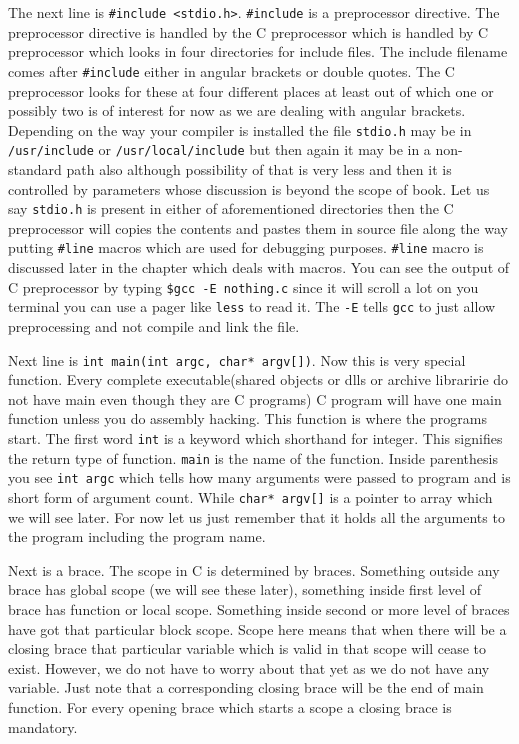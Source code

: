 The next line is \texttt{\#include <stdio.h>}. \texttt{\#include} is a
preprocessor directive. The preprocessor directive is handled by the C
preprocessor which is handled by C preprocessor which looks in four directories
for include files. The include filename comes after \texttt{\#include} either in
angular brackets or double quotes. The C preprocessor looks for these at four
different places at least out of which one or possibly two is of interest for
now as we are dealing with angular brackets. Depending on the way your compiler
is installed the file \texttt{stdio.h} may be in \texttt{/usr/include} or
\texttt{/usr/local/include} but then again it may be in a non-standard path
also although possibility of that is very less and then it is controlled by
parameters whose discussion is beyond the scope of book. Let us say
\texttt{stdio.h} is present in either of aforementioned directories then the C
preprocessor will copies the contents and pastes them in source file along the
way putting \texttt{\#line} macros which are used for debugging
purposes. \texttt{\#line} macro is discussed later in the chapter which deals
with macros. You can see the output of C preprocessor by typing \texttt{\$gcc
  -E nothing.c} since it will scroll a lot on you terminal you can use a pager
like \texttt{less} to read it. The \texttt{-E} tells \texttt{gcc} to just allow
preprocessing and not compile and link the file.

Next line is \texttt{int main(int argc, char* argv[])}. Now this is very special
function. Every complete executable(shared objects or dlls or archive
libraririe do not have main even though they are C programs) C program will
have one main function unless you do assembly hacking. This function is where
the programs start. The first word \texttt{int} is a keyword which shorthand
for integer. This signifies the return type of function. \texttt{main} is the
name of the function. Inside parenthesis you see \texttt{int argc} which tells
how many arguments were passed to program and is short form of argument
count. While \texttt{char* argv[]} is a pointer to array which we will see
later. For now let us just remember that it holds all the arguments to the
program including the program name.

Next is a brace. The scope in C is determined by braces. Something outside any
brace has global scope (we will see these later), something inside first level
of brace has function or local scope. Something inside second or more level of
braces have got that particular block scope. Scope here means that when there
will be a closing brace that particular variable which is valid in that scope
will cease to exist. However, we do not have to worry about that yet as we do
not have any variable. Just note that a corresponding closing brace will be the
end of main function. For every opening brace which starts a scope a closing
brace is mandatory.

